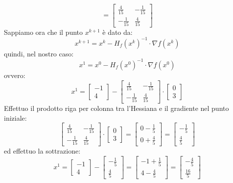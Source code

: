 \documentclass[a4paper,12pt, oneside]{book}
\begin{document}
\[=\left[
    \begin{matrix}
      \frac{4}{15} & - \frac{1}{15}\\
      - \frac{1}{15} &  \frac{4}{15}
    \end{matrix}\right]
\]
Sappiamo ora che il punto $x^{k+1}$ è dato da:
\[x^{k+1}=x^k-H_f(x^k)^{-1}\cdot\nabla f(x^k)\]
quindi, nel nostro caso:
\[x^{1}=x^0-H_f(x^0)^{-1}\cdot\nabla f(x^0)\]
ovvero:
\[x^1=\left[
    \begin{matrix}
      -1 \\
      4 
    \end{matrix}
  \right]-\left[
    \begin{matrix}
      \frac{4}{15} & - \frac{1}{15}\\
      - \frac{1}{15} &  \frac{4}{15}
    \end{matrix}\right]\cdot \left[
  \begin{matrix}
    0\\
    3
  \end{matrix}\right]\]
Effettuo il prodotto riga per colonna tra l'Hessiana e il gradiente
nel punto iniziale:
\[\left[
    \begin{matrix}
      \frac{4}{15} & - \frac{1}{15}\\
      - \frac{1}{15} &  \frac{4}{15}
    \end{matrix}\right]\cdot \left[
    \begin{matrix}
      0\\
      3
    \end{matrix}\right]=\left[
    \begin{matrix}
      0-\frac{1}{5}\\
      0+\frac{4}{5}
    \end{matrix}
  \right]=\left[
    \begin{matrix}
      -\frac{1}{5}\\
      \frac{4}{5}
    \end{matrix}
  \right]\]
ed effettuo la sottrazione:
\[x^1=\left[
    \begin{matrix}
      -1 \\
      4 
    \end{matrix}
  \right]-\left[
    \begin{matrix}
      -\frac{1}{5}\\
      \frac{4}{5}
    \end{matrix}
  \right]=\left[
    \begin{matrix}
      -1+\frac{1}{5}\\
      4-\frac{4}{5}
    \end{matrix}
  \right]=\left[
    \begin{matrix}
      -\frac{4}{5}\\
      \frac{16}{5}
    \end{matrix}
  \right]
\]
\end{document}
